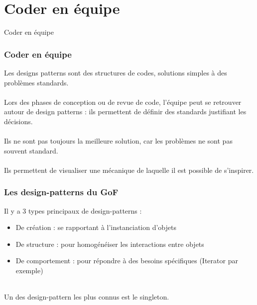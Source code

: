 \section{Coder en \'{e}quipe}

\begin{frame}
    \begin{center}
    \fontsize{48pt}{7.2}\selectfont
    Coder en \'{e}quipe
    \end{center}
\end{frame}

\begin{frame}
	\frametitle{Coder en \'{e}quipe}
    
    Les designs patterns sont des structures de codes, solutions simples \`{a} des probl\`{e}mes standards.
    \\~\\
    Lors des phases de conception ou de revue de code, l'\'{e}quipe peut se retrouver autour de design patterns : ils permettent de d\'{e}finir des standards justifiant les d\'{e}cisions.
    \\~\\
    Ils ne sont pas toujours la meilleure solution, car les probl\`{e}mes ne sont pas souvent standard.
    \\~\\
    Ils permettent de visualiser une m\'{e}canique de laquelle il est possible de s'inspirer.
\end{frame}

\begin{frame}
	\frametitle{Les design-patterns du GoF}
    Il y a 3 types principaux de design-patterns :
     \begin{itemize}
    	\item De cr\'{e}ation : se rapportant \`{a} l'instanciation d'objets
        \item De structure : pour homog\'{e}n\'{e}iser les interactions entre objets
        \item De comportement : pour r\'{e}pondre \`{a} des besoins sp\'{e}cifiques (Iterator par exemple)
    \end{itemize}
     ~\\
    Un des design-pattern les plus connus est le singleton.
    
\end{frame}

